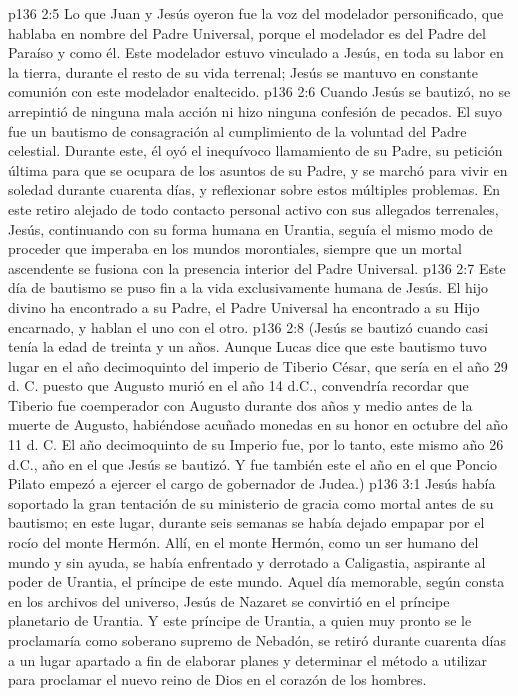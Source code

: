 \vs p136 2:5 Lo que Juan y Jesús oyeron fue la voz del modelador personificado, que hablaba en nombre del Padre Universal, porque el modelador es del Padre del Paraíso y como él. Este modelador estuvo vinculado a Jesús, en toda su labor en la tierra, durante el resto de su vida terrenal; Jesús se mantuvo en constante comunión con este modelador enaltecido.
\vs p136 2:6 \pc Cuando Jesús se bautizó, no se arrepintió de ninguna mala acción ni hizo ninguna confesión de pecados. El suyo fue un bautismo de consagración al cumplimiento de la voluntad del Padre celestial. Durante este, él oyó el inequívoco llamamiento de su Padre, su petición última para que se ocupara de los asuntos de su Padre, y se marchó para vivir en soledad durante cuarenta días, y reflexionar sobre estos múltiples problemas. En este retiro alejado de todo contacto personal activo con sus allegados terrenales, Jesús, continuando con su forma humana en Urantia, seguía el mismo modo de proceder que imperaba en los mundos morontiales, siempre que un mortal ascendente se fusiona con la presencia interior del Padre Universal.
\vs p136 2:7 Este día de bautismo se puso fin a la vida exclusivamente humana de Jesús. El hijo divino ha encontrado a su Padre, el Padre Universal ha encontrado a su Hijo encarnado, y hablan el uno con el otro.
\vs p136 2:8 \pc (Jesús se bautizó cuando casi tenía la edad de treinta y un años. Aunque Lucas dice que este bautismo tuvo lugar en el año decimoquinto del imperio de Tiberio César, que sería en el año 29 d. C. puesto que Augusto murió en el año 14 d.C., convendría recordar que Tiberio fue coemperador con Augusto durante dos años y medio antes de la muerte de Augusto, habiéndose acuñado monedas en su honor en octubre del año 11 d. C. El año decimoquinto de su Imperio fue, por lo tanto, este mismo año 26 d.C., año en el que Jesús se bautizó. Y fue también este el año en el que Poncio Pilato empezó a ejercer el cargo de gobernador de Judea.)
\vs p136 3:1 Jesús había soportado la gran tentación de su ministerio de gracia como mortal antes de su bautismo; en este lugar, durante seis semanas se había dejado empapar por el rocío del monte Hermón. Allí, en el monte Hermón, como un ser humano del mundo y sin ayuda, se había enfrentado y derrotado a Caligastia, aspirante al poder de Urantia, el príncipe de este mundo. Aquel día memorable, según consta en los archivos del universo, Jesús de Nazaret se convirtió en el príncipe planetario de Urantia. Y este príncipe de Urantia, a quien muy pronto se le proclamaría como soberano supremo de Nebadón, se retiró durante cuarenta días a un lugar apartado a fin de elaborar planes y determinar el método a utilizar para proclamar el nuevo reino de Dios en el corazón de los hombres.
